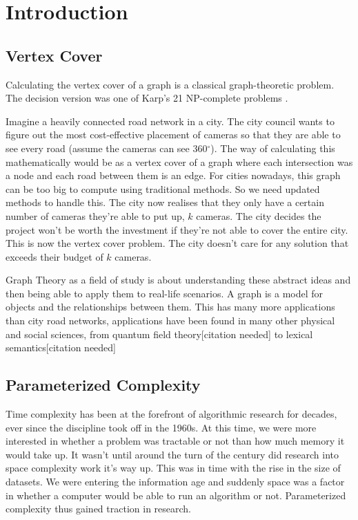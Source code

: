 \section{Introduction}

\subsection{Vertex Cover}

Calculating the vertex cover of a graph is a classical graph-theoretic
problem. The decision version was one of Karp's 21 NP-complete
problems \cite{karp1972reducibility}.

Imagine a heavily connected road network in a city. The city council
wants to figure out the most cost-effective placement of cameras so that
they are able to see every road (assume the cameras can see
360\(^\circ\)). The way of calculating this mathematically would be as a
vertex cover of a graph where each intersection was a node and each road
between them is an edge. For cities nowadays, this graph can be too big
to compute using traditional methods. So we need updated methods to
handle this. The city now realises that they only have a certain number
of cameras they're able to put up, \(k\) cameras. The city decides the
project won't be worth the investment if they're not able to cover the
entire city. This is now the vertex cover problem. The city doesn't care
for any solution that exceeds their budget of \(k\) cameras.

Graph Theory as a field of study is about understanding these abstract
ideas and then being able to apply them to real-life scenarios. A graph
is a model for objects and the relationships between them. This has many
more applications than city road networks, applications have been found
in many other physical and social sciences, from quantum field
theory{[}citation needed{]} to lexical semantics{[}citation needed{]}

\subsection{Parameterized Complexity}

Time complexity has been at the forefront of algorithmic research for
decades, ever since the discipline took off in the 1960s. At this time,
we were more interested in whether a problem was tractable or not than
how much memory it would take up. It wasn't until around the turn of the
century did research into space complexity work it's way up. This was in
time with the rise in the size of datasets. We were entering the
information age and suddenly space was a factor in whether a computer
would be able to run an algorithm or not. Parameterized complexity thus
gained traction in research.

